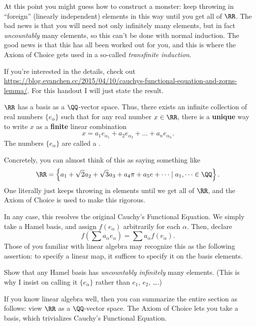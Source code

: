 \documentclass[11pt]{scrartcl}
\begin{document}
At this point you might guess how to construct a monster:
keep throwing in ``foreign'' (linearly independent) elements
in this way until you get all of $\RR$.
The bad news is that you will need not only infinitely many elements,
but in fact \emph{uncountably} many elements, so this can't be done with normal induction.
The good news is that this has all been worked out for you,
and this is where the Axiom of Choice gets used in a so-called \emph{transfinite induction}.

If you're interested in the details, check out
\url{https://blog.evanchen.cc/2015/04/10/cauchys-functional-equation-and-zorns-lemma/}.
For this handout I will just state the result.

\begin{proposition}
  $\RR$ has a basis as a $\QQ$-vector space.
  Thus, there exists an infinite collection of real numbers
  $\{e_\alpha\}$ such that for any real number $x \in \RR$,
  there is a \textbf{unique} way to write $x$ as a
  \textbf{finite} linear combination
  \[ x = a_1e_{\alpha_1} + a_2e_{\alpha_2} + \dots + a_n e_{\alpha_n}. \]
  The numbers $\{e_\alpha\}$ are called a .
\end{proposition}
Concretely, you can almost think of this as saying something like
\[ \RR = \left\{ a_1 + \sqrt2 a_2 + \sqrt3 a_3 + a_4\pi + a_5e + \dots
  \mid a_1, \dots \in \QQ \right\}. \]
One literally just keeps throwing in elements until we get all of $\RR$,
and the Axiom of Choice is used to make this rigorous.

In any case, this resolves the original Cauchy's Functional Equation.
We simply take a Hamel basis, and assign $f(e_\alpha)$ arbitrarily for each $\alpha$.
Then, declare
\[ \boxed{f\left(\sum a_\alpha e_\alpha \right) = \sum a_\alpha f(e_\alpha)}. \]
Those of you familiar with linear algebra may recognize this as the following assertion:
to specify a linear map, it suffices to specify it on the basis elements.

\begin{exercise}
  Show that any Hamel basis has \emph{uncountably infinitely} many elements.
  (This is why I insist on calling it $\{e_\alpha\}$ rather than $e_1$, $e_2$, \dots.)
\end{exercise}

If you know linear algebra well,
then you can summarize the entire section as follows:
view $\RR$ as a $\QQ$-vector space.
The Axiom of Choice lets you take a basis, which trivializes Cauchy's Functional Equation.
\end{document}
